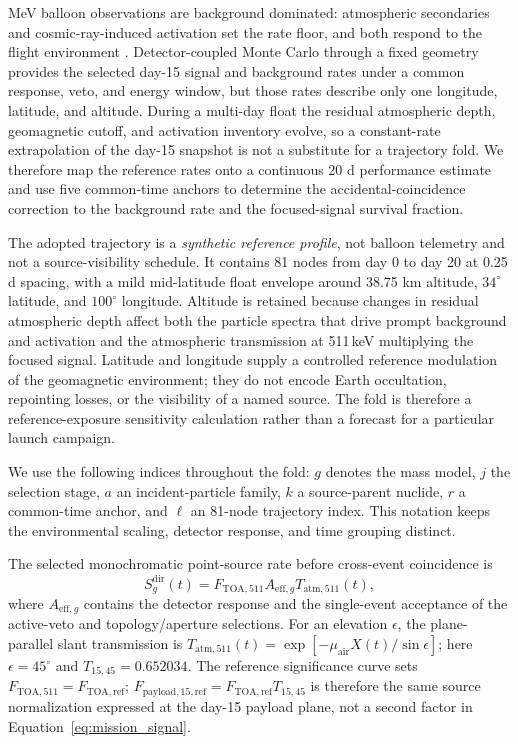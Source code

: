 \documentclass[11pt]{article}
\newcommand{\ftoaref}{F_{\mathrm{TOA,ref}}}
\newcommand{\fpayloadref}{F_{\mathrm{payload,15,ref}}}
\begin{document}
MeV balloon observations are background dominated: atmospheric secondaries and
cosmic-ray-induced activation set the rate floor, and both respond to the flight
environment \cite{Gallego2025Balloon,Kierans2017}. Detector-coupled Monte Carlo
through a fixed geometry provides the selected day-15 signal and background
rates under a common response, veto, and energy window, but those rates describe
only one longitude, latitude, and altitude. During a multi-day float the residual
atmospheric depth, geomagnetic cutoff, and activation inventory evolve, so a
constant-rate extrapolation of the day-15 snapshot is not a substitute for a
trajectory fold. We therefore map the reference rates onto a continuous 20 d
performance estimate and use five common-time anchors to determine the
accidental-coincidence correction to the background rate and the focused-signal
survival fraction.

The adopted trajectory is a \emph{synthetic reference profile}, not balloon
telemetry and not a source-visibility schedule. It contains 81 nodes from day 0
to day 20 at 0.25 d spacing, with a mild mid-latitude float envelope around
38.75 km altitude, $34^\circ$ latitude, and $100^\circ$ longitude. Altitude is
retained because changes in residual atmospheric depth affect both the particle
spectra that drive prompt background and activation and the atmospheric
transmission at 511\,keV multiplying the focused signal. Latitude and longitude supply a
controlled reference modulation of the geomagnetic environment; they do not
encode Earth occultation, repointing losses, or the visibility of a named source.
The fold is therefore a reference-exposure sensitivity calculation rather than a
forecast for a particular launch campaign.

We use the following indices throughout the fold: $g$ denotes the mass model,
$j$ the selection stage, $a$ an incident-particle family, $k$ a source-parent
nuclide, $r$ a common-time anchor, and $\ell$ an 81-node trajectory index. This
notation keeps the environmental scaling, detector response, and time grouping
distinct.

The selected monochromatic point-source rate before cross-event coincidence is
\begin{equation}
 S^{\mathrm{dir}}_g(t)=F_{\mathrm{TOA},511}A_{\mathrm{eff},g}T_{\mathrm{atm},511}(t),
 \label{eq:mission_signal}
\end{equation}
where $A_{\mathrm{eff},g}$ contains the detector response and the single-event
acceptance of the active-veto and topology/aperture selections. For an elevation $\epsilon$, the plane-parallel
slant transmission is
$T_{\mathrm{atm},511}(t)=\exp[-\mu_{\mathrm{air}}X(t)/\sin\epsilon]$; here
$\epsilon=45^\circ$ and $T_{15,45}=0.652034$. The reference significance curve
sets $F_{\mathrm{TOA},511}=\ftoaref$; $\fpayloadref=\ftoaref T_{15,45}$ is therefore the
same source normalization expressed at the day-15 payload plane, not a second
factor in Equation~\eqref{eq:mission_signal}.
\end{document}
